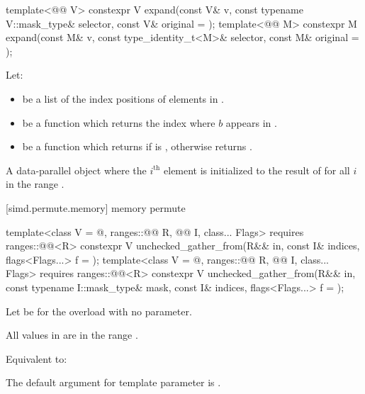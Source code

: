 \begin{itemdecl}
template<@@ V>
  constexpr V expand(const V& v, const typename V::mask_type& selector, const V& original = {});
template<@@ M>
  constexpr M expand(const M& v, const type_identity_t<M>& selector, const M& original = {});
\end{itemdecl}

\begin{itemdescr}
\pnum
Let:
\begin{itemize}
\item
{} be a list of the index positions of 
elements in .
\item
{} be a function which returns the index
where $b$ appears in .
\item
{} be a function which returns
 if  is
, otherwise returns .
\end{itemize}

\pnum
\returns
A data-parallel object where the $i^\text{th}$
element is initialized to the result of 
for all $i$ in the range .
\end{itemdescr}

[simd.permute.memory]{ memory permute}

\begin{itemdecl}
template<class V = @\seebelow@, ranges::@@ R, @@ I, class... Flags>
  requires ranges::@@<R>
  constexpr V unchecked_gather_from(R&& in, const I& indices, flags<Flags...> f = {});
template<class V = @\seebelow@, ranges::@@ R, @@ I, class... Flags>
  requires ranges::@@<R>
  constexpr V unchecked_gather_from(R&& in, const typename I::mask_type& mask,
                                    const I& indices, flags<Flags...> f = {});
\end{itemdecl}

\begin{itemdescr}
\pnum
Let  be  for the overload with
no  parameter.

\pnum
\expects
All values in  are in
the range .

\pnum
\effects
Equivalent to: 

\pnum
\remarks
The default argument for template parameter  is
.
\end{itemdescr}

